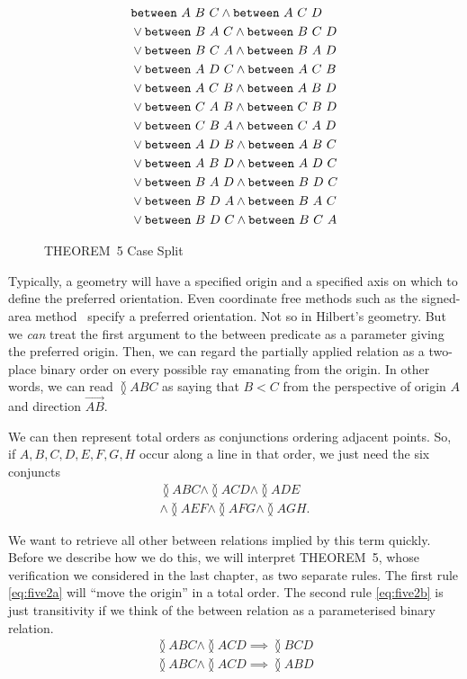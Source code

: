 \begin{figure}
  \begin{align*}
    &\texttt{between}\ A\ B\ C\wedge\texttt{between}\ A\ C\ D\\
    &\vee\texttt{between}\ B\ A\ C\wedge\texttt{between}\ B\ C\ D\\
    &\vee\texttt{between}\ B\ C\ A\wedge\texttt{between}\ B\ A\ D\\
    &\vee\texttt{between}\ A\ D\ C\wedge\texttt{between}\ A\ C\ B\\
    &\vee\texttt{between}\ A\ C\ B\wedge\texttt{between}\ A\ B\ D\\
    &\vee\texttt{between}\ C\ A\ B\wedge\texttt{between}\ C\ B\ D\\
    &\vee\texttt{between}\ C\ B\ A\wedge\texttt{between}\ C\ A\ D\\
    &\vee\texttt{between}\ A\ D\ B\wedge\texttt{between}\ A\ B\ C\\
    &\vee\texttt{between}\ A\ B\ D\wedge\texttt{between}\ A\ D\ C\\
    &\vee\texttt{between}\ B\ A\ D\wedge\texttt{between}\ B\ D\ C\\
    &\vee\texttt{between}\ B\ D\ A\wedge\texttt{between}\ B\ A\ C\\
    &\vee\texttt{between}\ B\ D\ C\wedge\texttt{between}\ B\ C\ A
  \end{align*}
\caption{THEOREM~5 Case Split}
\label{fig:Theorem5CasesFormalised}
\end{figure}

Typically, a geometry will have a specified origin and a specified axis on which to define the preferred orientation. Even coordinate free methods such as the signed-area method~\cite{SignedAreaMethod} specify a preferred orientation. Not so in Hilbert's geometry. But we \emph{can} treat the first argument to the between predicate as a parameter giving the preferred origin. Then, we can regard the partially applied relation as a two-place binary order on every possible ray emanating from the origin. In other words, we can read $\between{A}{B}{C}$ as saying that $B<C$ from the perspective of origin $A$ and direction $\overrightarrow{AB}$.

We can then represent total orders as conjunctions ordering adjacent points. So, if $A,B,C,D,E,F,G,H$ occur along a line in that order, we just need the six conjuncts
\begin{multline}\label{theorem:OrderRepExample}
\between{A}{B}{C} \wedge \between{A}{C}{D} \wedge \between{A}{D}{E}\\
\wedge\between{A}{E}{F}\wedge\between{A}{F}{G}\wedge\between{A}{G}{H}.
\end{multline}

We want to retrieve all other between relations implied by this term quickly. Before we describe how we do this, we will interpret THEOREM~5, whose verification we considered in the last chapter, as two separate rules. The first rule \eqref{eq:five2a} will ``move the origin'' in a total order. The second rule \eqref{eq:five2b} is just transitivity if we think of the between relation as a parameterised binary relation.
\begin{gather}
\label{eq:five2a}\between{A}{B}{C} \wedge \between{A}{C}{D} \implies \between{B}{C}{D}\\
\label{eq:five2b}\between{A}{B}{C} \wedge \between{A}{C}{D} \implies \between{A}{B}{D}
\end{gather}

